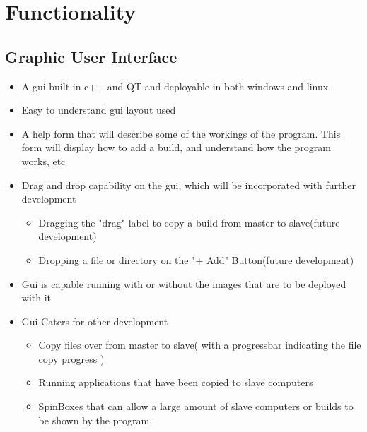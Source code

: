 \documentclass[a4paper,12pt,final]{article}
\begin{document}
\section{Functionality}
\subsection{Graphic User Interface}
\begin{itemize}
\item A gui built in c++ and QT and deployable in both windows and linux.
\item Easy to understand gui layout used
\item A help form that will describe some of the workings of the program. This form will display how to add a build, and understand how the program works, etc
\item Drag and drop capability on the gui, which will be incorporated with further development
\begin{itemize}
\item Dragging the "drag" label to copy a build from master to slave(future development)
\item Dropping a file or directory on the "+ Add" Button(future development)
\end{itemize}
\item Gui is capable running with or without the images that are to be deployed with it
\item Gui Caters for other development
\begin{itemize}
\item Copy files over from master to slave( with a progressbar indicating the file copy progress )
\item Running applications that have been copied to slave computers
\item SpinBoxes that can allow a large amount of slave computers or builds to be shown by the program
\end{itemize}
\end{itemize}
\end{document}
